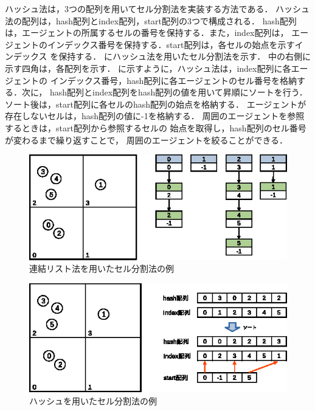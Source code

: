 ハッシュ法は，3つの配列を用いてセル分割法を実装する方法である．
ハッシュ法の配列は，hash配列とindex配列，start配列の3つで構成される．
hash配列は，エージェントの所属するセルの番号を保持する．また，index配列は，
エージェントのインデックス番号を保持する．start配列は，各セルの始点を示すインデックス
を保持する．
にハッシュ法を用いたセル分割法を示す．
中の右側に示す四角は，各配列を示す．
に示すように，ハッシュ法は，index配列に各エージェントの
インデックス番号，hash配列に各エージェントのセル番号を格納する．次に，
hash配列とindex配列をhash配列の値を用いて昇順にソートを行う．
ソート後は，start配列に各セルのhash配列の始点を格納する．
エージェントが存在しないセルは，hash配列の値に-1を格納する．
周囲のエージェントを参照するときは，start配列から参照するセルの
始点を取得し，hash配列のセル番号が変わるまで繰り返すことで，
周囲のエージェントを絞ることができる．

\begin{figure}[t]
 \begin{center}
  \includegraphics[width=11.5cm,clip]{figure/serubunkatu_serurinku.eps}
  \caption{連結リスト法を用いたセル分割法の例}
  \label{fig:renketu_list}
 \end{center}
\end{figure}

\begin{figure}[t]
 \begin{center}
  \includegraphics[width=11.5cm,clip]{figure/serubunkatu_hash.eps}
  \caption{ハッシュを用いたセル分割法の例}
  \label{fig:hash}
 \end{center}
\end{figure}

